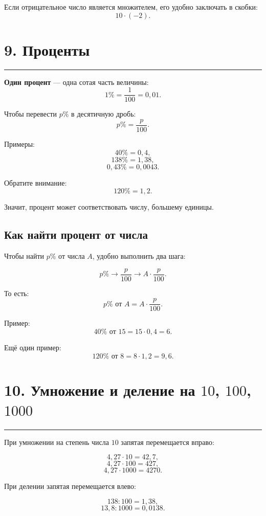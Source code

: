 \documentclass[a4paper,12pt]{article}
\newcommand{\sectionline}{%
    \vspace{-0.25em}
    {\color{accent}\rule{\linewidth}{0.7pt}}
    \vspace{0.3em}
}
\begin{document}
Если отрицательное число является множителем, его удобно заключать в скобки:
\[
10\cdot(-2).
\]


\section*{\color{darkaccent}9. Проценты}
\sectionline

\textbf{Один процент} --- одна сотая часть величины:
\[
1\%=\frac1{100}=0{,}01.
\]

Чтобы перевести \(p\%\) в десятичную дробь:
\[
\boxed{p\%=\frac{p}{100}}.
\]

Примеры:
\[
40\%=0{,}4,
\]
\[
138\%=1{,}38,
\]
\[
0{,}43\%=0{,}0043.
\]

Обратите внимание:
\[
120\%=1{,}2.
\]

Значит, процент может соответствовать числу, большему единицы.

\subsection*{\color{accent}Как найти процент от числа}

Чтобы найти \(p\%\) от числа \(A\), удобно выполнить два шага:

\[
p\%
\longrightarrow
\frac{p}{100}
\longrightarrow
A\cdot\frac{p}{100}.
\]

То есть:
\[
\boxed{p\%\text{ от }A=A\cdot\frac{p}{100}}.
\]

Пример:
\[
40\%\text{ от }15
=
15\cdot0{,}4
=
6.
\]

Ещё один пример:
\[
120\%\text{ от }8
=
8\cdot1{,}2
=
9{,}6.
\]


\section*{\color{darkaccent}10. Умножение и деление на \(10\), \(100\), \(1000\)}
\sectionline

При умножении на степень числа \(10\) запятая перемещается вправо:

\[
4{,}27\cdot10=42{,}7,
\]
\[
4{,}27\cdot100=427,
\]
\[
4{,}27\cdot1000=4270.
\]

При делении запятая перемещается влево:

\[
138:100=1{,}38,
\]
\[
13{,}8:1000=0{,}0138.
\]
\end{document}
